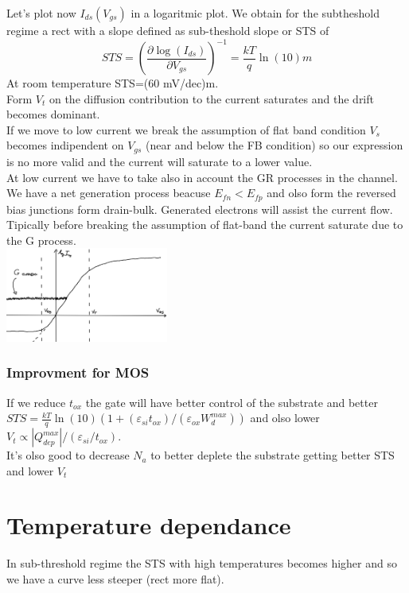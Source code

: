 Let's plot now $I_{ds}(V_{gs})$ in a logaritmic plot. We obtain for the subtheshold regime a rect with a slope defined as sub-theshold slope or STS of 
\begin{equation}
STS=\left(\frac{\partial \log(I_{ds})}{\partial V_{gs}}\right)^{-1}=\frac{kT}{q}\ln(10)m
\end{equation} 
At room temperature STS=(60 mV/dec)m.\\ 
Form $V_t$ on the diffusion contribution to the current saturates and the drift becomes dominant.\\
If we move to low current we break the assumption of flat band condition $V_s$ becomes indipendent on $V_{gs}$ (near and below the FB condition) so our expression is no more valid and the current will saturate to a lower value.\\
At low current we have to take also in account the GR processes in the channel. We have a net generation process beacuse $E_{fn}<E_{fp}$ and olso form the reversed bias junctions form drain-bulk. Generated electrons will assist the current flow. Tipically before breaking the assumption of flat-band the current saturate due to the G process.\\

\centering
\includegraphics[width=0.4\textwidth]{noisefloor.png}\\
\raggedright

\subsubsection{Improvment for MOS}
If we reduce $t_{ox}$ the gate will have better control of the substrate and better $STS=\frac{kT}{q}\ln(10)(1+(\varepsilon_{si}t_{ox})/(\varepsilon_{ox}W_d^{max}))$ and olso lower $V_t\propto|Q_{dep}^{max}|/(\varepsilon_{si}/t_{ox})$.\\
It's olso good to decrease $N_a$ to better deplete the substrate getting better STS and lower $V_t$


\section{Temperature dependance}
In sub-threshold regime the STS with high temperatures becomes higher and so we have a curve less steeper (rect more flat).\\


